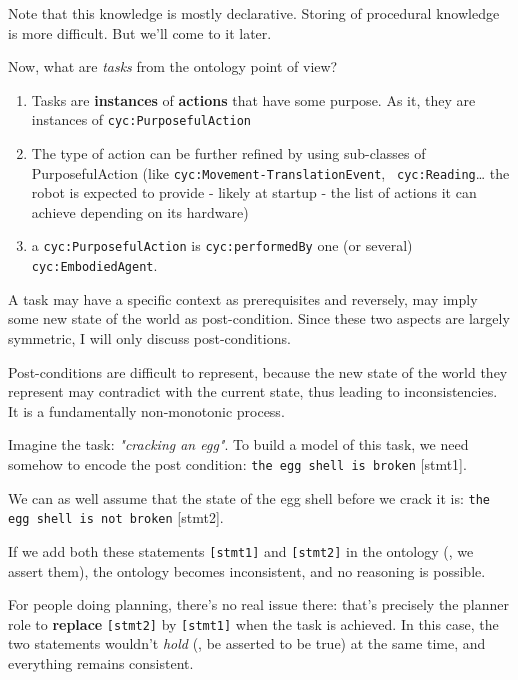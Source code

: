 Note that this knowledge is mostly declarative. Storing of procedural knowledge
is more difficult. But we'll come to it later.

Now, what are \emph{tasks} from the ontology point of view?

\begin{enumerate}

    \item  Tasks are {\bf instances} of {\bf actions} that have some purpose.
    As it, they are instances of {\tt cyc:PurposefulAction}

    \item  The type of action can be further refined by using sub-classes of
    PurposefulAction (like {\tt cyc:Movement-TranslationEvent}, {\tt
    cyc:Reading}\ldots{} the robot is expected to provide - likely at startup -
    the list of actions it can achieve depending on its hardware)

    \item  a {\tt cyc:PurposefulAction} is {\tt cyc:performedBy} one (or
    several) {\tt cyc:EmbodiedAgent}.

\end{enumerate}


A task may have a specific context as prerequisites and reversely, may
imply some new state of the world as post-condition.  Since these two aspects
are largely symmetric, I will only discuss post-conditions.

Post-conditions are difficult to represent, because the new state of the world
they represent may contradict with the current state, thus leading to
inconsistencies. It is a fundamentally non-monotonic process.

Imagine the task: \emph{"cracking an egg"}. To build a
model of this task, we need somehow to encode the post condition: {\tt the egg
shell is broken} [stmt1].

We can as well assume that the state of the egg shell before we crack it is:
{\tt the egg shell is not broken} [stmt2].

If we add both these statements {\tt [stmt1]} and {\tt [stmt2]} in the ontology
(\ie, we assert them), the ontology becomes inconsistent, and no reasoning is
possible.

For people doing planning, there's no real issue there: that's precisely the
planner role to {\bf replace} {\tt [stmt2]} by {\tt [stmt1]} when the task is
achieved. In this case, the two statements wouldn't \emph{hold} (\ie, be
asserted to be true) at the same time, and everything remains consistent.

